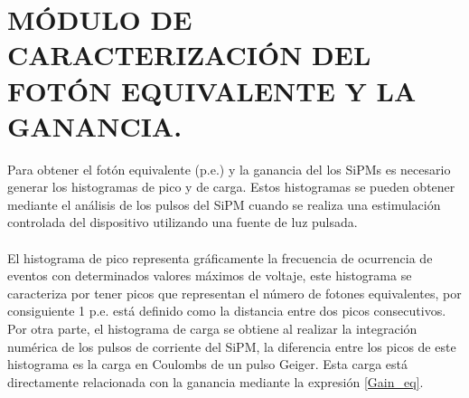 \section{MÓDULO DE CARACTERIZACIÓN DEL FOTÓN EQUIVALENTE Y LA GANANCIA.}
Para obtener el fotón equivalente (p.e.) y la ganancia del los SiPMs es necesario generar los histogramas de pico y de carga. Estos histogramas se pueden obtener mediante el análisis de los pulsos del SiPM cuando se realiza una estimulación controlada del dispositivo utilizando una fuente de luz pulsada.\\ \\
El histograma de pico representa gráficamente la frecuencia de ocurrencia de eventos con determinados valores máximos de voltaje, este histograma se caracteriza por tener picos que representan el número de fotones equivalentes, por consiguiente 1 p.e. está definido como la distancia entre dos picos consecutivos. Por otra parte, el histograma de carga se obtiene al realizar la integración numérica de los pulsos de corriente del SiPM, la diferencia entre los picos de este histograma es la carga en Coulombs de un pulso Geiger. Esta carga está directamente relacionada con la ganancia mediante la expresión \ref{Gain_eq}.       
